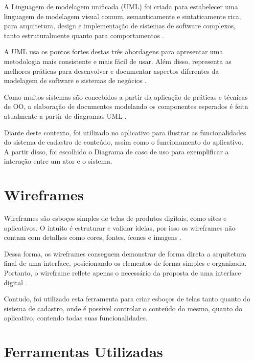 A Linguagem de modelagem unificada (UML) foi criada para estabelecer uma linguagem de modelagem visual comum, semanticamente e sintaticamente rica, para arquitetura, design e implementação de sistemas de software complexos, tanto estruturalmente quanto para comportamentos \cite{lucidchart2021}.

A UML usa os pontos fortes destas três abordagens para apresentar uma metodologia mais consistente e mais fácil de usar. Além disso, representa as melhores práticas para desenvolver e documentar aspectos diferentes da modelagem de software e sistemas de negócios \cite{lucidchart2021}.

Como muitos sistemas são concebidos a partir da aplicação de práticas e técnicas de OO, a elaboração de documentos modelando os componentes esperados é feita atualmente a partir de diagramas UML \cite{renatojosegroffe2013}.

Diante deste contexto, foi utilizado no aplicativo para ilustrar as funcionalidades do sistema de cadastro de conteúdo, assim como o funcionamento do aplicativo. A partir disso, foi escolhido o Diagrama de caso de uso para exemplificar a interação entre um ator e o sistema.


\section{Wireframes}
\label{wireframes}

Wireframes são esboços simples de telas de produtos digitais, como sites e aplicativos. O intuito é estruturar e validar ideias, por isso os wireframes não contam com detalhes como cores, fontes, ícones e imagens \cite{editorialaela.io2019}.

Dessa forma, os wireframes conseguem demonstrar de forma direta a arquitetura final de uma interface, posicionando os elementos de forma simples e organizada. Portanto, o wireframe reflete apenas o necessário da proposta de uma interface digital \cite{editorialaela.io2019}.

Contudo, foi utilizado esta ferramenta para criar esboços de telas tanto quanto do sistema de cadastro, onde é possível controlar o conteúdo do mesmo, quanto do aplicativo, contendo todas suas funcionalidades.

\section{Ferramentas Utilizadas}
\label{ferramentasUtilizadas}

